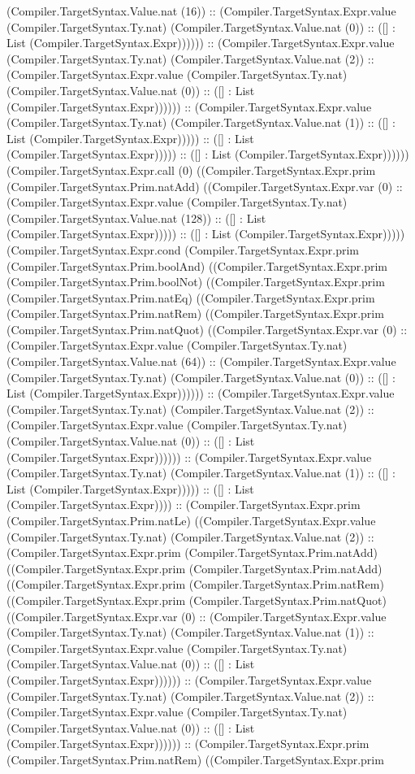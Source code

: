 \documentclass[11pt]{article}
\begin{document}
(Compiler.TargetSyntax.Value.nat (16)) :: (Compiler.TargetSyntax.Expr.value (Compiler.TargetSyntax.Ty.nat) (Compiler.TargetSyntax.Value.nat (0)) :: ([] : List (Compiler.TargetSyntax.Expr)))))) :: (Compiler.TargetSyntax.Expr.value (Compiler.TargetSyntax.Ty.nat) (Compiler.TargetSyntax.Value.nat (2)) :: (Compiler.TargetSyntax.Expr.value (Compiler.TargetSyntax.Ty.nat) (Compiler.TargetSyntax.Value.nat (0)) :: ([] : List (Compiler.TargetSyntax.Expr)))))) :: (Compiler.TargetSyntax.Expr.value (Compiler.TargetSyntax.Ty.nat) (Compiler.TargetSyntax.Value.nat (1)) :: ([] : List (Compiler.TargetSyntax.Expr))))) :: ([] : List (Compiler.TargetSyntax.Expr))))) :: ([] : List (Compiler.TargetSyntax.Expr)))))) (Compiler.TargetSyntax.Expr.call (0) ((Compiler.TargetSyntax.Expr.prim (Compiler.TargetSyntax.Prim.natAdd) ((Compiler.TargetSyntax.Expr.var (0) :: (Compiler.TargetSyntax.Expr.value (Compiler.TargetSyntax.Ty.nat) (Compiler.TargetSyntax.Value.nat (128)) :: ([] : List (Compiler.TargetSyntax.Expr))))) :: ([] : List (Compiler.TargetSyntax.Expr))))) (Compiler.TargetSyntax.Expr.cond (Compiler.TargetSyntax.Expr.prim (Compiler.TargetSyntax.Prim.boolAnd) ((Compiler.TargetSyntax.Expr.prim (Compiler.TargetSyntax.Prim.boolNot) ((Compiler.TargetSyntax.Expr.prim (Compiler.TargetSyntax.Prim.natEq) ((Compiler.TargetSyntax.Expr.prim (Compiler.TargetSyntax.Prim.natRem) ((Compiler.TargetSyntax.Expr.prim (Compiler.TargetSyntax.Prim.natQuot) ((Compiler.TargetSyntax.Expr.var (0) :: (Compiler.TargetSyntax.Expr.value (Compiler.TargetSyntax.Ty.nat) (Compiler.TargetSyntax.Value.nat (64)) :: (Compiler.TargetSyntax.Expr.value (Compiler.TargetSyntax.Ty.nat) (Compiler.TargetSyntax.Value.nat (0)) :: ([] : List (Compiler.TargetSyntax.Expr)))))) :: (Compiler.TargetSyntax.Expr.value (Compiler.TargetSyntax.Ty.nat) (Compiler.TargetSyntax.Value.nat (2)) :: (Compiler.TargetSyntax.Expr.value (Compiler.TargetSyntax.Ty.nat) (Compiler.TargetSyntax.Value.nat (0)) :: ([] : List (Compiler.TargetSyntax.Expr)))))) :: (Compiler.TargetSyntax.Expr.value (Compiler.TargetSyntax.Ty.nat) (Compiler.TargetSyntax.Value.nat (1)) :: ([] : List (Compiler.TargetSyntax.Expr))))) :: ([] : List (Compiler.TargetSyntax.Expr)))) :: (Compiler.TargetSyntax.Expr.prim (Compiler.TargetSyntax.Prim.natLe) ((Compiler.TargetSyntax.Expr.value (Compiler.TargetSyntax.Ty.nat) (Compiler.TargetSyntax.Value.nat (2)) :: (Compiler.TargetSyntax.Expr.prim (Compiler.TargetSyntax.Prim.natAdd) ((Compiler.TargetSyntax.Expr.prim (Compiler.TargetSyntax.Prim.natAdd) ((Compiler.TargetSyntax.Expr.prim (Compiler.TargetSyntax.Prim.natRem) ((Compiler.TargetSyntax.Expr.prim (Compiler.TargetSyntax.Prim.natQuot) ((Compiler.TargetSyntax.Expr.var (0) :: (Compiler.TargetSyntax.Expr.value (Compiler.TargetSyntax.Ty.nat) (Compiler.TargetSyntax.Value.nat (1)) :: (Compiler.TargetSyntax.Expr.value (Compiler.TargetSyntax.Ty.nat) (Compiler.TargetSyntax.Value.nat (0)) :: ([] : List (Compiler.TargetSyntax.Expr)))))) :: (Compiler.TargetSyntax.Expr.value (Compiler.TargetSyntax.Ty.nat) (Compiler.TargetSyntax.Value.nat (2)) :: (Compiler.TargetSyntax.Expr.value (Compiler.TargetSyntax.Ty.nat) (Compiler.TargetSyntax.Value.nat (0)) :: ([] : List (Compiler.TargetSyntax.Expr)))))) :: (Compiler.TargetSyntax.Expr.prim (Compiler.TargetSyntax.Prim.natRem) ((Compiler.TargetSyntax.Expr.prim 
\end{document}

